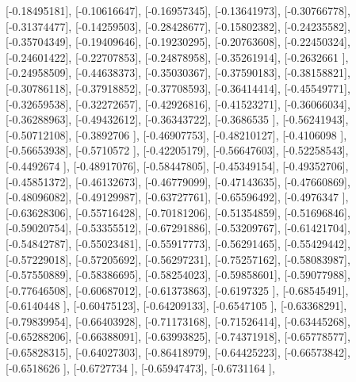 \documentclass{article}
\begin{document}
       [-0.18495181],
       [-0.10616647],
       [-0.16957345],
       [-0.13641973],
       [-0.30766778],
       [-0.31374477],
       [-0.14259503],
       [-0.28428677],
       [-0.15802382],
       [-0.24235582],
       [-0.35704349],
       [-0.19409646],
       [-0.19230295],
       [-0.20763608],
       [-0.22450324],
       [-0.24601422],
       [-0.22707853],
       [-0.24878958],
       [-0.35261914],
       [-0.2632661 ],
       [-0.24958509],
       [-0.44638373],
       [-0.35030367],
       [-0.37590183],
       [-0.38158821],
       [-0.30786118],
       [-0.37918852],
       [-0.37708593],
       [-0.36414414],
       [-0.45549771],
       [-0.32659538],
       [-0.32272657],
       [-0.42926816],
       [-0.41523271],
       [-0.36066034],
       [-0.36288963],
       [-0.49432612],
       [-0.36343722],
       [-0.3686535 ],
       [-0.56241943],
       [-0.50712108],
       [-0.3892706 ],
       [-0.46907753],
       [-0.48210127],
       [-0.4106098 ],
       [-0.56653938],
       [-0.5710572 ],
       [-0.42205179],
       [-0.56647603],
       [-0.52258543],
       [-0.4492674 ],
       [-0.48917076],
       [-0.58447805],
       [-0.45349154],
       [-0.49352706],
       [-0.45851372],
       [-0.46132673],
       [-0.46779099],
       [-0.47143635],
       [-0.47660869],
       [-0.48096082],
       [-0.49129987],
       [-0.63727761],
       [-0.65596492],
       [-0.4976347 ],
       [-0.63628306],
       [-0.55716428],
       [-0.70181206],
       [-0.51354859],
       [-0.51696846],
       [-0.59020754],
       [-0.53355512],
       [-0.67291886],
       [-0.53209767],
       [-0.61421704],
       [-0.54842787],
       [-0.55023481],
       [-0.55917773],
       [-0.56291465],
       [-0.55429442],
       [-0.57229018],
       [-0.57205692],
       [-0.56297231],
       [-0.75257162],
       [-0.58083987],
       [-0.57550889],
       [-0.58386695],
       [-0.58254023],
       [-0.59858601],
       [-0.59077988],
       [-0.77646508],
       [-0.60687012],
       [-0.61373863],
       [-0.6197325 ],
       [-0.68545491],
       [-0.6140448 ],
       [-0.60475123],
       [-0.64209133],
       [-0.6547105 ],
       [-0.63368291],
       [-0.79839954],
       [-0.66403928],
       [-0.71173168],
       [-0.71526414],
       [-0.63445268],
       [-0.65288206],
       [-0.66388091],
       [-0.63993825],
       [-0.74371918],
       [-0.65778577],
       [-0.65828315],
       [-0.64027303],
       [-0.86418979],
       [-0.64425223],
       [-0.66573842],
       [-0.6518626 ],
       [-0.6727734 ],
       [-0.65947473],
       [-0.6731164 ],
\end{document}
